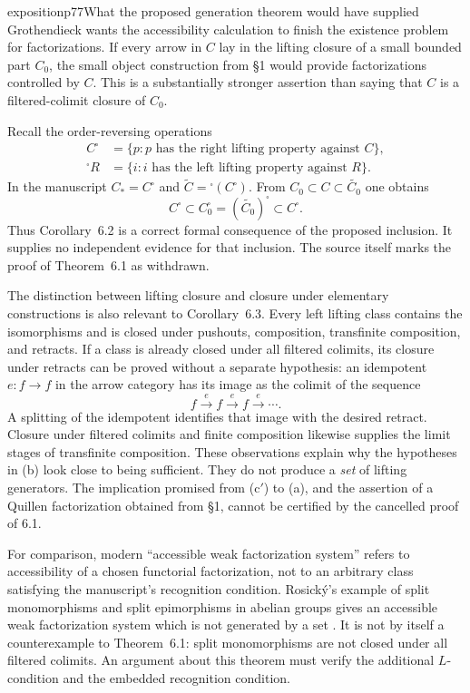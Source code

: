 \begin{dcomment}{exposition}{p77}{What the proposed generation theorem would have supplied}
Grothendieck wants the accessibility calculation to finish the existence problem for factorizations. If every arrow in $C$ lay in the lifting closure of a small bounded part $C_0$, the small object construction from \S1 would provide factorizations controlled by $C$. This is a substantially stronger assertion than saying that $C$ is a filtered-colimit closure of $C_0$.

Recall the order-reversing operations
\[
 \begin{aligned}
 C^{\square}&=\{p: p\text{ has the right lifting property against }C\},\\
 {}^{\square}R&=\{i:i\text{ has the left lifting property against }R\}.
 \end{aligned}
\]
In the manuscript $C_*=C^{\square}$ and $\widetilde C={}^{\square}(C^{\square})$. From $C_0\subset C\subset\widetilde {C_0}$ one obtains
\[
 C^{\square}\subset C_0^{\square}
       =(\widetilde {C_0})^{\square}\subset C^{\square}.
\]
Thus Corollary~6.2 is a correct formal consequence of the proposed inclusion. It supplies no independent evidence for that inclusion. The source itself marks the proof of Theorem~6.1 as withdrawn.

The distinction between lifting closure and closure under elementary constructions is also relevant to Corollary~6.3. Every left lifting class contains the isomorphisms and is closed under pushouts, composition, transfinite composition, and retracts. If a class is already closed under all filtered colimits, its closure under retracts can be proved without a separate hypothesis: an idempotent $e:f\to f$ in the arrow category has its image as the colimit of the sequence
\[
 f\xrightarrow e f\xrightarrow e f\xrightarrow e\cdots.
\]
A splitting of the idempotent identifies that image with the desired retract. Closure under filtered colimits and finite composition likewise supplies the limit stages of transfinite composition. These observations explain why the hypotheses in (b) look close to being sufficient. They do not produce a \emph{set} of lifting generators. The implication promised from (c$'$) to (a), and the assertion of a Quillen factorization obtained from \S1, cannot be certified by the cancelled proof of 6.1.

For comparison, modern ``accessible weak factorization system'' refers to accessibility of a chosen functorial factorization, not to an arbitrary class satisfying the manuscript's recognition condition. Rosick\'y's example of split monomorphisms and split epimorphisms in abelian groups gives an accessible weak factorization system which is not generated by a set \citep[Example~2.8]{Rosicky2017Accessible}. It is not by itself a counterexample to Theorem~6.1: split monomorphisms are not closed under all filtered colimits. An argument about this theorem must verify the additional $L$-condition and the embedded recognition condition.


\end{dcomment}
